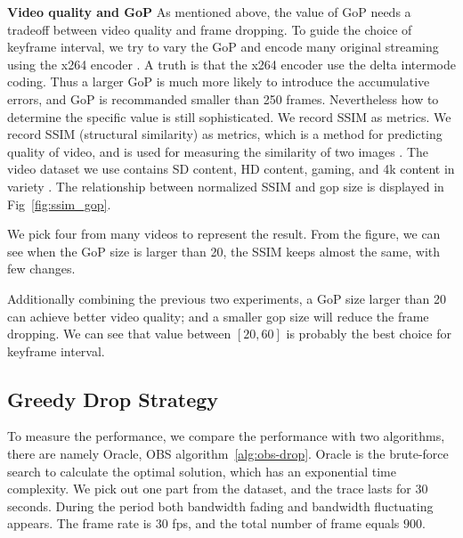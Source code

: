 \textbf{Video quality and GoP} As mentioned above, the value of GoP needs a tradeoff between video quality and frame dropping. To guide the choice of keyframe interval, we try to vary the GoP and encode many original streaming using the x264 encoder \cite{x264}. A truth is that the x264 encoder use the delta intermode coding. Thus a larger GoP is much more likely to introduce the accumulative errors, and GoP is recommanded smaller than 250 frames. Nevertheless how to determine the specific value is still sophisticated. We record SSIM as metrics. We record SSIM (structural similarity) as metrics, which is a method for predicting quality of video, and is used for measuring the similarity of two images \cite{wang2004image}. The video dataset we use contains SD content, HD content, gaming, and 4k content in variety \cite{video_dataset}. The relationship between normalized SSIM and gop size is displayed in Fig~\ref{fig:ssim_gop}.

We pick four from many videos to represent the result. From the figure, we can see when the GoP size is larger than 20, the SSIM keeps almost the same, with few changes.

Additionally combining the previous two experiments, a GoP size larger than 20 can achieve better video quality; and a smaller gop size will reduce the frame dropping. We can see that value between $[20,60]$ is probably the best choice for keyframe interval.

\iffalse

\textbf{Varying bitrate.}
To make the conclusion more visible, we fix key frame interval to be 8s and introduce network interruption between 19s and 21s. In different experiments, we provide sufficient network bandwidth and vary the bitrate to be 1000kbps, 1500kbps, 2000kbps, and 2500kbps. The frame drop is shown in Table~\ref{tab:bitrate}. The different bitrates do not make much difference, the number of drop in all cases is about 149.

\textbf{Summary.} We summarize and get conclusions. First, reducing keyframe interval leads to less frame drop. Second, bitrate does not influence frame drop for the short-term case, but the quality of each picture. Preliminary Evaluation points out that a small GoP is one useful try.
\fi

\subsection{Greedy Drop Strategy}
To measure the performance, we compare the performance with two algorithms, there are namely Oracle, OBS algorithm~\ref{alg:obs-drop}. Oracle is the brute-force search to calculate the optimal solution, which has an exponential time complexity. We pick out one part from the dataset, and the trace lasts for $30$ seconds. During the period both bandwidth fading and bandwidth fluctuating appears. The frame rate is $30$ fps, and the total number of frame equals $900$.

